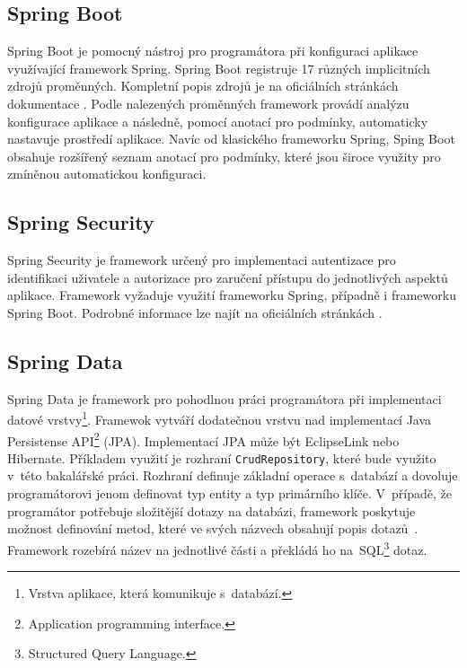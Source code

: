     \subsection{Spring Boot}
        Spring Boot je pomocný nástroj pro programátora při konfiguraci aplikace využívající framework Spring. Spring Boot registruje 17 různých implicitních zdrojů proměnných. Kompletní popis zdrojů je na oficiálních stránkách dokumentace \cite{spring-property-sources}. Podle nalezených proměnných framework provádí analýzu konfigurace aplikace a následně, pomocí anotací pro podmínky, automaticky nastavuje prostředí aplikace. Navíc od klasického frameworku Spring, Sping Boot obsahuje rozšířený seznam anotací pro podmínky, které jsou široce využity pro zmíněnou automatickou konfiguraci.\cite{spring-boot}
    
    \subsection{Spring Security}
        Spring Security je framework určený pro implementaci autentizace pro identifikaci uživatele a autorizace pro zaručení přístupu do jednotlivých aspektů aplikace. Framework vyžaduje využití frameworku Spring, případně i frameworku Spring Boot.   Podrobné informace lze najít na oficiálních stránkách \cite{spring-security}.
    
    \subsection{Spring Data}
        Spring Data je framework pro pohodlnou práci programátora při implementaci datové vrstvy\footnote{Vrstva aplikace, která komunikuje s~databází.}. Framewok vytváří dodatečnou vrstvu nad implementací Java Persistense API\footnote{Application programming interface.} (JPA). Implementací JPA může být EclipseLink nebo Hibernate. Příkladem využití je rozhraní \texttt{CrudRepository}, které bude využito v~této bakalářské práci. Rozhraní definuje základní operace s~databází a dovoluje programátorovi jenom definovat typ entity a typ primárního klíče. V~případě, že programátor potřebuje složitější dotazy na databázi, framework poskytuje možnost definování metod, které ve svých názvech obsahují popis dotazů~\cite{query-methods}. Framework rozebírá název na jednotlivé části a překládá ho na~SQL\footnote{Structured Query Language.} dotaz.
    
